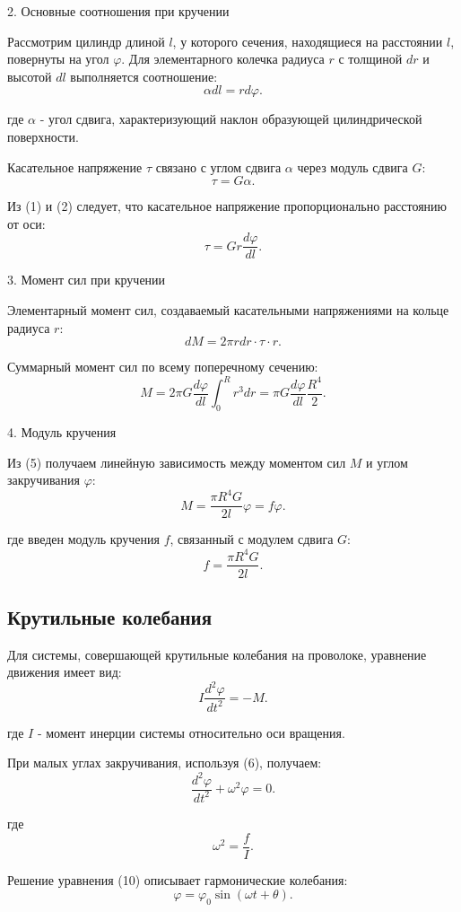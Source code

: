 \documentclass[a4paper, 12pt]{article}
\begin{document}
2. Основные соотношения при кручении

Рассмотрим цилиндр длиной \( l \), у которого сечения, находящиеся на расстоянии \( l \), повернуты на угол \( \varphi \). Для элементарного колечка радиуса \( r \) с толщиной \( dr \) и высотой \( dl \) выполняется соотношение:
\[
\alpha dl = rd\varphi.\tag{1}
\]

где \( \alpha \) - угол сдвига, характеризующий наклон образующей цилиндрической поверхности.

Касательное напряжение \( \tau \) связано с углом сдвига \( \alpha \) через модуль сдвига \( G \):
\[
\tau = G\alpha.\tag{2}
\]


Из (1) и (2) следует, что касательное напряжение пропорционально расстоянию от оси:
\[
\tau = Gr\frac{d\varphi}{dl}.\tag{3}
\]


3. Момент сил при кручении

Элементарный момент сил, создаваемый касательными напряжениями на кольце радиуса \( r \):
\[
dM = 2\pi rdr \cdot \tau \cdot r.\tag{4}
\]


Суммарный момент сил по всему поперечному сечению:
\[
M = 2\pi G \frac{d\varphi}{dl} \int_{0}^{R} r^3 dr = \pi G \frac{d\varphi}{dl} \frac{R^4}{2}.\tag{5}
\]


4. Модуль кручения

Из (5) получаем линейную зависимость между моментом сил \( M \) и углом закручивания \( \varphi \):
\[
M = \frac{\pi R^4 G}{2l} \varphi = f\varphi.\tag{6}
\]


где введен модуль кручения \( f \), связанный с модулем сдвига \( G \):
\[
f = \frac{\pi R^4 G}{2l}.\tag{7}
\]


\subsection{Крутильные колебания}

Для системы, совершающей крутильные колебания на проволоке, уравнение движения имеет вид:
\[
I \frac{d^2 \varphi}{dt^2} = -M.\tag{8}
\]

где \( I \) - момент инерции системы относительно оси вращения.

При малых углах закручивания, используя (6), получаем:
\[
\frac{d^2 \varphi}{dt^2} + \omega^2 \varphi = 0.\tag{10}
\]

где
\[
\omega^2 = \frac{f}{I}.
\]


Решение уравнения (10) описывает гармонические колебания:
\[
\varphi = \varphi_0 \sin(\omega t + \theta).\tag{11}
\]
\end{document}
